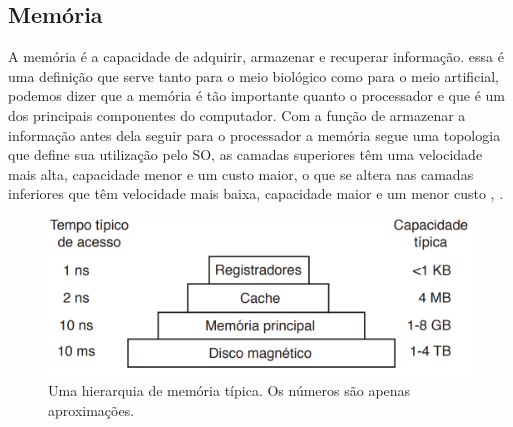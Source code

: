 \subsection{Memória}
A memória é a capacidade de adquirir, armazenar e recuperar informação. essa é uma definição que serve tanto para o meio biológico como para o meio artificial, podemos dizer que a memória  é tão importante quanto o processador e que é um dos principais componentes do computador. 
Com a função de armazenar a informação antes dela seguir para o processador a memória segue uma topologia que define sua utilização pelo SO, as camadas superiores têm uma velocidade mais alta, capacidade menor e um custo maior, o que se altera nas camadas inferiores que têm velocidade mais baixa, capacidade maior e um menor custo \cite{Tanenbaum2016}, \cite{Comer2012}.\\
\begin{figure}[htpb]
    \centering
   \includegraphics[scale=0.5]{imagens/lvlmemoria.png}
   \caption{Uma hierarquia de memória típica. Os números são apenas aproximações. \cite{Tanenbaum2016}}
   \label{fig:lvlmemoria}
\end{figure}

